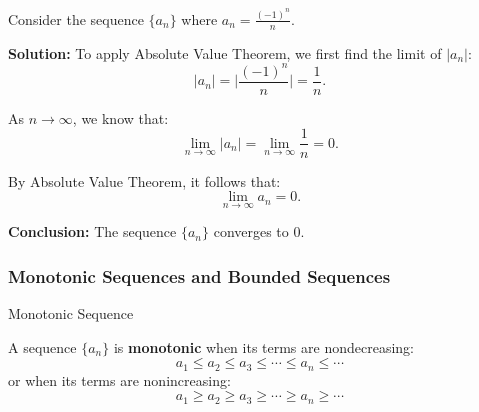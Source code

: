 \documentclass[12pt]{article}
\theoremstyle{beautifulthm}
\begin{document}
\begin{tcolorbox}[colback=examplebg, colframe=red!75!black, title=\textbf{EXAMPLE 5: Find the Integral of the Function}, fonttitle=\bfseries, sharp corners]

Consider the sequence $\{a_n\}$ where $a_n = \frac{(-1)^n}{n}$.

\tcblower
\textbf{Solution:} 
To apply Absolute Value Theorem, we first find the limit of $\lvert a_n \rvert$:
\[
\lvert a_n \rvert = \lvert \frac{(-1)^n}{n} \rvert = \frac{1}{n}.
\]

As $n \to \infty$, we know that:
\[
\lim_{n \to \infty} \lvert a_n \rvert = \lim_{n \to \infty} \frac{1}{n} = 0.
\]

By Absolute Value Theorem, it follows that:
\[
\lim_{n \to \infty} a_n = 0.
\]

\textbf{Conclusion:} The sequence $\{a_n\}$ converges to $0$.
\end{tcolorbox}

\newpage



\subsubsection{Monotonic Sequences and Bounded Sequences}

\begin{Definition}{Monotonic Sequence}{}

A sequence $\{a_n\}$ is \textbf{monotonic} when its terms are nondecreasing:
\[
a_1 \leq a_2 \leq a_3 \leq \cdots \leq a_n \leq \cdots
\]
or when its terms are nonincreasing:
\[
a_1 \geq a_2 \geq a_3 \geq \cdots \geq a_n \geq \cdots
\]
    
\end{Definition}
\end{document}
